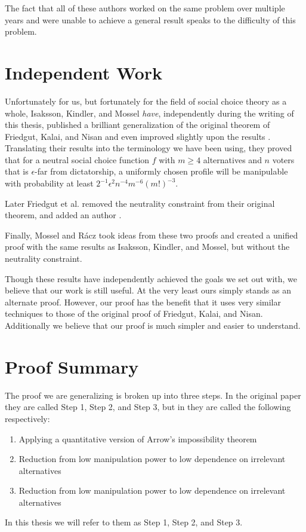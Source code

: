 	The fact that all of these authors worked on the same problem over multiple years and were unable to achieve a general result speaks to the difficulty of this problem.


\section{Independent Work}


	Unfortunately for us, but fortunately for the field of social choice theory as a whole, Isaksson, Kindler, and Mossel \emph{have}, independently during the writing of this thesis, published a brilliant generalization of the original theorem of Friedgut, Kalai, and Nisan and even improved slightly upon the results \cite{isaksson2010geometry}. Translating their results into the terminology we have been using, they proved that for a neutral social choice function $f$ with $m \ge 4$ alternatives and $n$ voters that is $\epsilon$-far from dictatorship, a uniformly chosen profile will be manipulable with probability at least $2^{-1} \epsilon^2 n^{-4} m^{-6} (m!)^{-3}$.

	Later Friedgut et al. removed the neutrality constraint from their original theorem, and added an author \cite{friedgut2011quantitative}.

	Finally, Mossel and R\'{a}cz \cite{mossel2011quantitative} took ideas from these two proofs and created a unified proof with the same results as Isaksson, Kindler, and Mossel, but without the neutrality constraint.

	Though these results have independently achieved the goals we set out with, we believe that our work is still useful. At the very least ours simply stands as an alternate proof. However, our proof has the benefit that it uses very similar techniques to those of the original proof of Friedgut, Kalai, and Nisan. Additionally we believe that our proof is much simpler and easier to understand.


\section {Proof Summary}

	The proof we are generalizing is broken up into three steps. In the original paper they are called Step 1, Step 2, and Step 3, but in \cite{friedgut2011quantitative} they are called the following respectively:
	\begin{enumerate}
		\item Applying a quantitative version of Arrow's impossibility theorem
		\item Reduction from low manipulation power to low dependence on irrelevant alternatives
		\item Reduction from low manipulation power to low dependence on irrelevant alternatives
	\end{enumerate}
	In this thesis we will refer to them as Step 1, Step 2, and Step 3.

